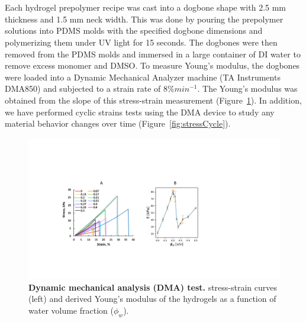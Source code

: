 \section{}
Each hydrogel prepolymer recipe was cast into a dogbone shape with 2.5 mm thickness and 1.5 mm neck width. This was done by pouring the prepolymer solutions into PDMS molds with the specified dogbone dimensions and polymerizing them under UV light for 15 seconds. The dogbones were then removed from the PDMS molds and immersed in a large container of DI water to remove excess monomer and DMSO. To measure Young’s modulus, the dogbones were loaded into a Dynamic Mechanical Analyzer machine (TA Instruments DMA850) and subjected to a strain rate of $8\% min^{-1}$. The Young’s modulus was obtained from the slope of this stress-strain measurement (Figure~\ref{fig:DMA}). In addition, we have performed cyclic strains tests using the DMA device to study any material behavior changes over time (Figure~\ref{fig:stressCycle}).

\begin{figure}[!th]
      \centering
      \includegraphics[width=\textwidth]{DMA.pdf}
      \caption[]{\textbf{Dynamic mechanical analysis (DMA) test.} stress-strain curves (left) and derived Young’s modulus of the hydrogels as a function of water volume fraction ($\phi_{w}$).}
      \label{fig:DMA}
\end{figure}

